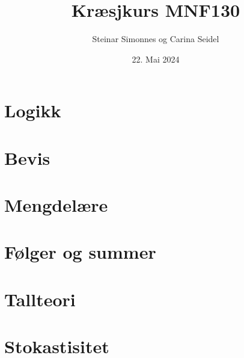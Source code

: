 \documentclass[aspectratio=169,fleqn,handout,xcolor={dvipsnames}]{beamer}
\author[ls]{Steinar Simonnes og Carina Seidel}
\title[sgp]{Kræsjkurs MNF130}
\institute{Institutt for Informatikk \\ Universitetet i Bergen}
\date[22.05.24]{22. Mai 2024}
\begin{document}


\section{Logikk}




\section{Bevis}




\section{Mengdelære}


% 


% 
% 
% 
% 
% 

\section{Følger og summer}


\section{Tallteori}





% 
% 
% 

\section{Stokastisitet}



\end{document}

